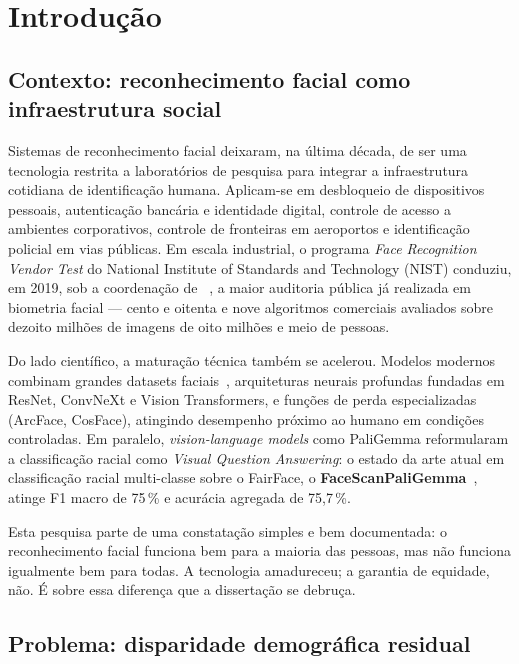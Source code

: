 \section{Introdução}
\label{sec:introducao}

\subsection{Contexto: reconhecimento facial como infraestrutura social}
\label{sec:contexto}

Sistemas de reconhecimento facial deixaram, na última década, de ser uma tecnologia restrita a laboratórios de pesquisa para integrar a infraestrutura cotidiana de identificação humana. Aplicam-se em desbloqueio de dispositivos pessoais, autenticação bancária e identidade digital, controle de acesso a ambientes corporativos, controle de fronteiras em aeroportos e identificação policial em vias públicas. Em escala industrial, o programa \emph{Face Recognition Vendor Test} do National Institute of Standards and Technology (NIST) conduziu, em 2019, sob a coordenação de \citeauthor{grother2019face}~\autocite{grother2019face}, a maior auditoria pública já realizada em biometria facial --- cento e oitenta e nove algoritmos comerciais avaliados sobre dezoito milhões de imagens de oito milhões e meio de pessoas.

Do lado científico, a maturação técnica também se acelerou. Modelos modernos combinam grandes datasets faciais~\autocite{karkkainen2021fairface,wang2019racial,robinson2020face}, arquiteturas neurais profundas fundadas em ResNet, ConvNeXt e Vision Transformers, e funções de perda especializadas (ArcFace, CosFace), atingindo desempenho próximo ao humano em condições controladas. Em paralelo, \emph{vision-language models} como PaliGemma reformularam a classificação racial como \emph{Visual Question Answering}: o estado da arte atual em classificação racial multi-classe sobre o FairFace, o \textbf{FaceScanPaliGemma}~\autocite{aldahoul2024exploring}, atinge F1 macro de 75\,\% e acurácia agregada de 75,7\,\%.

Esta pesquisa parte de uma constatação simples e bem documentada: o reconhecimento facial funciona bem para a maioria das pessoas, mas não funciona igualmente bem para todas. A tecnologia amadureceu; a garantia de equidade, não. É sobre essa diferença que a dissertação se debruça.

\subsection{Problema: disparidade demográfica residual}
\label{sec:problema}

